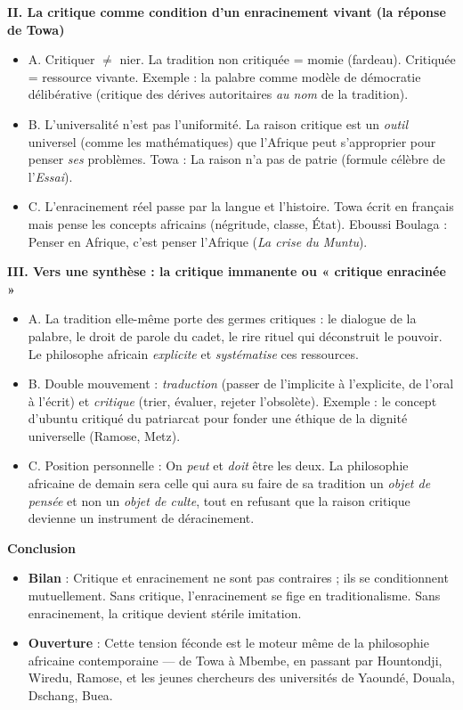 \documentclass[11pt]{article}
\begin{document}
\begin{exoresolu}
\textbf{II. La critique comme condition d'un enracinement vivant (la réponse de Towa)}
\begin{itemize}
\item A. Critiquer $\neq$ nier. La tradition non critiquée = momie (fardeau). Critiquée = ressource vivante. Exemple : la palabre comme modèle de démocratie délibérative (critique des dérives autoritaires \emph{au nom} de la tradition).
\item B. L'universalité n'est pas l'uniformité. La raison critique est un \emph{outil} universel (comme les mathématiques) que l'Afrique peut s'approprier pour penser \emph{ses} problèmes. Towa : \guillemotleft La raison n'a pas de patrie \guillemotright (formule célèbre de l'\emph{Essai}).
\item C. L'enracinement réel passe par la langue et l'histoire. Towa écrit en français mais pense les concepts africains (négritude, classe, État). Eboussi Boulaga : \guillemotleft Penser en Afrique, c'est penser l'Afrique \guillemotright (\emph{La crise du Muntu}).
\end{itemize}

\textbf{III. Vers une synthèse : la critique immanente ou « critique enracinée »}
\begin{itemize}
\item A. La tradition elle-même porte des germes critiques : le dialogue de la palabre, le droit de parole du cadet, le rire rituel qui déconstruit le pouvoir. Le philosophe africain \emph{explicite} et \emph{systématise} ces ressources.
\item B. Double mouvement : \emph{traduction} (passer de l'implicite à l'explicite, de l'oral à l'écrit) et \emph{critique} (trier, évaluer, rejeter l'obsolète). Exemple : le concept d'ubuntu critiqué du patriarcat pour fonder une éthique de la dignité universelle (Ramose, Metz).
\item C. Position personnelle : On \emph{peut} et \emph{doit} être les deux. La philosophie africaine de demain sera celle qui aura su faire de sa tradition un \emph{objet de pensée} et non un \emph{objet de culte}, tout en refusant que la raison critique devienne un instrument de déracinement.
\end{itemize}

\medskip
\textbf{Conclusion}
\begin{itemize}
\item \textbf{Bilan} : Critique et enracinement ne sont pas contraires ; ils se conditionnent mutuellement. Sans critique, l'enracinement se fige en traditionalisme. Sans enracinement, la critique devient stérile imitation.
\item \textbf{Ouverture} : Cette tension féconde est le moteur même de la philosophie africaine contemporaine — de Towa à Mbembe, en passant par Hountondji, Wiredu, Ramose, et les jeunes chercheurs des universités de Yaoundé, Douala, Dschang, Buea.
\end{itemize}
\end{exoresolu}
\end{document}
